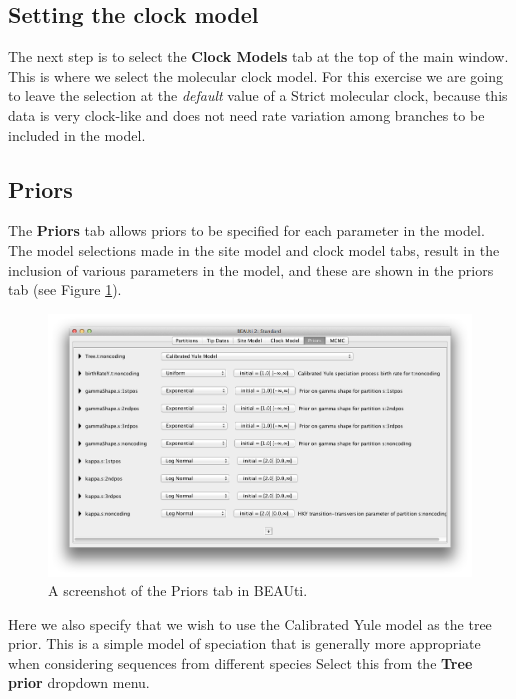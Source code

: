 \documentclass[11pt]{article}
\theoremstyle{plain}%
\theoremstyle{definition}
\theoremstyle{remark}
\begin{document}
\subsection{Setting the clock model}

The next step is to select the {\bf Clock Models} tab at the top of the
main window. This is where we select the molecular clock model. For this exercise we are going to leave the selection at the {\it default} value of a Strict molecular clock, because this data is very clock-like and does not need rate variation among branches to be included in the model.


\subsection{Priors }

The {\bf Priors} tab allows priors to be specified for each parameter in the
model. The model selections made in the site model and clock model tabs, result in the inclusion of various parameters
in the model, and these are shown in the priors tab (see Figure \ref{fig:BEAUti_Prior1}).

\begin{figure}
\includegraphics[width=\textwidth]{figures/BEAUti_Prior1}
\caption{A screenshot of the Priors tab in BEAUti. }
\label{fig:BEAUti_Prior1}
\end{figure}

Here we also specify that we wish to use the Calibrated Yule model \cite{Heled:2012fk}
as the tree prior. This is a simple model of speciation that
is generally more appropriate when considering sequences from different species %
Select this from the {\bf Tree prior} dropdown menu.
\end{document}
